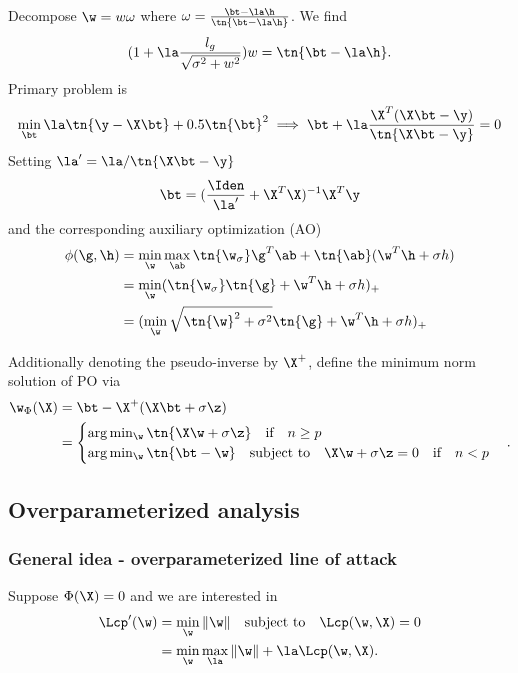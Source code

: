 Decompose $\w=w\omega$ where $\omega=\frac{\bt-\la \h}{\tn{\bt-\la \h}}$. We find
\[
(1+\la \frac{l_g}{\sqrt{\sigma^2+w^2}})w=\tn{\bt-\la \h}.
\]
Primary problem is
\[
\min_{\bt}\la \tn{\y-\X\bt}+0.5\tn{\bt}^2\implies \bt+\la \frac{\X^T(\X\bt-\y)}{\tn{\X\bt-\y}}=0
\]
Setting $\la'=\la/\tn{\X\bt-\y}$
\[
\bt=(\frac{\Iden}{\la'}+\X^T\X)^{-1}\X^T\y
\]
\newpage
and the corresponding auxiliary optimization (AO)
\begin{align}
\phi(\g,\h)&=\min_{\w}\max_{\ab} \tn{\w_{\sigma}}\g^T\ab+\tn{\ab}(\w^T\h+\sigma h)\\\
&=\min_{\w}(\tn{\w_{\sigma}}\tn{\g}+\w^T\h+\sigma h)_+\\
&=(\min_{\w}\sqrt{\tn{\w}^2+\sigma^2}\tn{\g}+\w^T\h+\sigma h)_+
\end{align}

Additionally denoting the pseudo-inverse by $\X^+$, define the minimum norm solution of PO via
\begin{align}
\w_\Phi(\X)&=\bt-\X^+(\X\bt+\sigma\z)\\
&=\begin{cases}\arg\min_{\w}\tn{\X\w+\sigma \z}\quad \text{if}\quad n\geq p\\\arg\min_{\w}\tn{\bt-\w}\quad\text{subject to}\quad\X\w+\sigma \z=0\quad\text{if}\quad n<p\end{cases}.%
\end{align}

\subsection{Overparameterized analysis}
\subsubsection{General idea - overparameterized line of attack}
Suppose $\Phi(\X)=0$ and we are interested in
\begin{align}
\Lcp'(\w)&=\min_{\w} \|\w\|\quad\text{subject to}\quad \Lcp(\w,\X)=0\\
&=\min_{\w}\max_{\la} \|\w\|+\la\Lcp(\w,\X).
\end{align}
